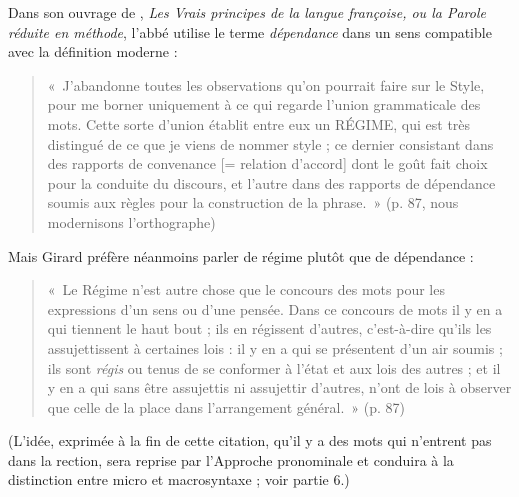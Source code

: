 {    Dans son ouvrage de \citeyear{girad1747vrais}, \textit{Les Vrais principes de la langue françoise, ou la Parole réduite en méthode}, l’abbé  utilise le terme \textit{dépendance} dans un sens compatible avec la définition moderne :
    \begin{quote}
    «~J’abandonne toutes les observations qu’on pourrait faire sur le Style, pour me borner uniquement à ce qui regarde l’union grammaticale des mots. Cette sorte d’union établit entre eux un RÉGIME, qui est très distingué de ce que je viens de nommer style ; ce dernier consistant dans des rapports de convenance [= relation d’accord] dont le goût fait choix pour la conduite du discours, et l’autre dans des rapports de dépendance soumis aux règles pour la construction de la phrase.~» (p. 87, nous modernisons l’orthographe)\end{quote}
    Mais Girard préfère néanmoins parler de régime plutôt que de dépendance : 
    \begin{quote}«~Le Régime n’est autre chose que le concours des mots pour les expressions d’un sens ou d’une pensée. Dans ce concours de mots il y en a qui tiennent le haut bout ; ils en régissent d’autres, c’est-à-dire qu’ils les assujettissent à certaines lois : il y en a qui se présentent d’un air soumis ; ils sont \textit{régis} ou tenus de se conformer à l’état et aux lois des autres ; et il y en a qui sans être assujettis ni assujettir d’autres, n’ont de lois à observer que celle de la place dans l’arrangement général.~» (p. 87)\end{quote}
    
  (L’idée, exprimée à la fin de cette citation, qu’il y a des mots qui n’entrent pas dans la rection, sera reprise par l’Approche pronominale et conduira à la distinction entre micro et macrosyntaxe ; voir partie 6.)

}
